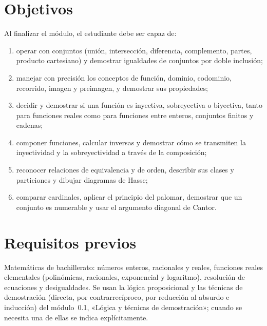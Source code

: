 \documentclass[11pt,a4paper,twoside,openany]{book}
\begin{document}
\section*{Objetivos}
Al finalizar el módulo, el estudiante debe ser capaz de:
\begin{enumerate}[label=\arabic*.]
  \item operar con conjuntos (unión, intersección, diferencia, complemento, partes, producto cartesiano) y demostrar igualdades de conjuntos por doble inclusión;
  \item manejar con precisión los conceptos de función, dominio, codominio, recorrido, imagen y preimagen, y demostrar sus propiedades;
  \item decidir y demostrar si una función es inyectiva, sobreyectiva o biyectiva, tanto para funciones reales como para funciones entre enteros, conjuntos finitos y cadenas;
  \item componer funciones, calcular inversas y demostrar cómo se transmiten la inyectividad y la sobreyectividad a través de la composición;
  \item reconocer relaciones de equivalencia y de orden, describir sus clases y particiones y dibujar diagramas de Hasse;
  \item comparar cardinales, aplicar el principio del palomar, demostrar que un conjunto es numerable y usar el argumento diagonal de Cantor.
\end{enumerate}

\section*{Requisitos previos}
Matemáticas de bachillerato: números enteros, racionales y reales, funciones reales elementales (polinómicas, racionales, exponencial y logaritmo), resolución de ecuaciones y desigualdades. Se usan la lógica proposicional y las técnicas de demostración (directa, por contrarrecíproco, por reducción al absurdo e inducción) del módulo~0.1, «Lógica y técnicas de demostración»; cuando se necesita una de ellas se indica explícitamente.
\end{document}
